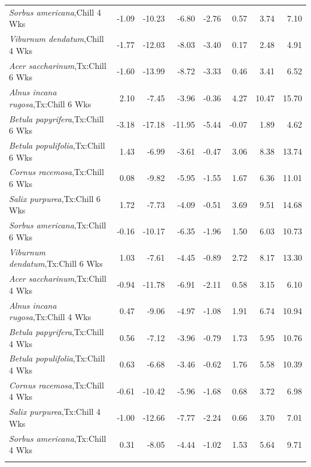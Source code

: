 \documentclass{article}\usepackage[]{graphicx}\usepackage[]{color}
\begin{document}
\begin{longtable}{lrrrrrrr}
  \textit{Sorbus americana},Chill 4 Wks & -1.09 & -10.23 & -6.80 & -2.76 & 0.57 & 3.74 & 7.10 \\ 
  \textit{Viburnum dendatum},Chill 4 Wks & -1.77 & -12.03 & -8.03 & -3.40 & 0.17 & 2.48 & 4.91 \\ 
  \textit{Acer saccharinum},Tx:Chill 6 Wks & -1.60 & -13.99 & -8.72 & -3.33 & 0.46 & 3.41 & 6.52 \\ 
  \textit{Alnus incana rugosa},Tx:Chill 6 Wks & 2.10 & -7.45 & -3.96 & -0.36 & 4.27 & 10.47 & 15.70 \\ 
  \textit{Betula papyrifera},Tx:Chill 6 Wks & -3.18 & -17.18 & -11.95 & -5.44 & -0.07 & 1.89 & 4.62 \\ 
  \textit{Betula populifolia},Tx:Chill 6 Wks & 1.43 & -6.99 & -3.61 & -0.47 & 3.06 & 8.38 & 13.74 \\ 
  \textit{Cornus racemosa},Tx:Chill 6 Wks & 0.08 & -9.82 & -5.95 & -1.55 & 1.67 & 6.36 & 11.01 \\ 
  \textit{Salix purpurea},Tx:Chill 6 Wks & 1.72 & -7.73 & -4.09 & -0.51 & 3.69 & 9.51 & 14.68 \\ 
  \textit{Sorbus americana},Tx:Chill 6 Wks & -0.16 & -10.17 & -6.35 & -1.96 & 1.50 & 6.03 & 10.73 \\ 
  \textit{Viburnum dendatum},Tx:Chill 6 Wks & 1.03 & -7.61 & -4.45 & -0.89 & 2.72 & 8.17 & 13.30 \\ 
  \textit{Acer saccharinum},Tx:Chill 4 Wks & -0.94 & -11.78 & -6.91 & -2.11 & 0.58 & 3.15 & 6.10 \\ 
  \textit{Alnus incana rugosa},Tx:Chill 4 Wks & 0.47 & -9.06 & -4.97 & -1.08 & 1.91 & 6.74 & 10.94 \\ 
  \textit{Betula papyrifera},Tx:Chill 4 Wks & 0.56 & -7.12 & -3.96 & -0.79 & 1.73 & 5.95 & 10.76 \\ 
  \textit{Betula populifolia},Tx:Chill 4 Wks & 0.63 & -6.68 & -3.46 & -0.62 & 1.76 & 5.58 & 10.39 \\ 
  \textit{Cornus racemosa},Tx:Chill 4 Wks & -0.61 & -10.42 & -5.96 & -1.68 & 0.68 & 3.72 & 6.98 \\ 
  \textit{Salix purpurea},Tx:Chill 4 Wks & -1.00 & -12.66 & -7.77 & -2.24 & 0.66 & 3.70 & 7.01 \\ 
  \textit{Sorbus americana},Tx:Chill 4 Wks & 0.31 & -8.05 & -4.44 & -1.02 & 1.53 & 5.64 & 9.71 \\ 
   \hline
\hline
\label{tab:suppmodtotbio}
\end{longtable}
\end{document}
